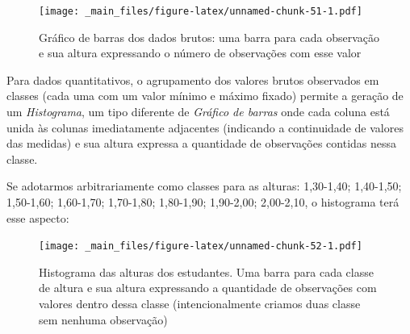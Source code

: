 \documentclass[
]{book}
\newenvironment{Shaded}{\begin{snugshade}}{\end{snugshade}}
\newcommand{\AttributeTok}[1]{\textcolor[rgb]{0.77,0.63,0.00}{#1}}
\newcommand{\DecValTok}[1]{\textcolor[rgb]{0.00,0.00,0.81}{#1}}
\newcommand{\FloatTok}[1]{\textcolor[rgb]{0.00,0.00,0.81}{#1}}
\newcommand{\FunctionTok}[1]{\textcolor[rgb]{0.00,0.00,0.00}{#1}}
\newcommand{\NormalTok}[1]{#1}
\newcommand{\SpecialCharTok}[1]{\textcolor[rgb]{0.00,0.00,0.00}{#1}}
\newcommand{\StringTok}[1]{\textcolor[rgb]{0.31,0.60,0.02}{#1}}
\begin{document}
\begin{figure}
\centering
\texttt{[image: \_main\_files/figure-latex/unnamed-chunk-51-1.pdf]}
\caption{\label{fig:unnamed-chunk-51}Gráfico de barras dos dados brutos: uma barra para cada observação e sua altura expressando o número de observações com esse valor}
\end{figure}

Para dados quantitativos, o agrupamento dos valores brutos observados em classes (cada uma com um valor mínimo e máximo fixado) permite a geração de um \emph{Histograma}, um tipo diferente de \emph{Gráfico de barras} onde cada coluna está unida às colunas imediatamente adjacentes (indicando a continuidade de valores das medidas) e sua altura expressa a quantidade de observações contidas nessa classe.

Se adotarmos arbitrariamente como classes para as alturas: 1,30-1,40; 1,40-1,50; 1,50-1,60; 1,60-1,70; 1,70-1,80; 1,80-1,90; 1,90-2,00; 2,00-2,10, o histograma terá esse aspecto:

\begin{Shaded}
\end{Shaded}

\begin{figure}
\centering
\texttt{[image: \_main\_files/figure-latex/unnamed-chunk-52-1.pdf]}
\caption{\label{fig:unnamed-chunk-52}Histograma das alturas dos estudantes. Uma barra para cada classe de altura e sua altura expressando a quantidade de observações com valores dentro dessa classe (intencionalmente criamos duas classe sem nenhuma observação)}
\end{figure}
\end{document}
